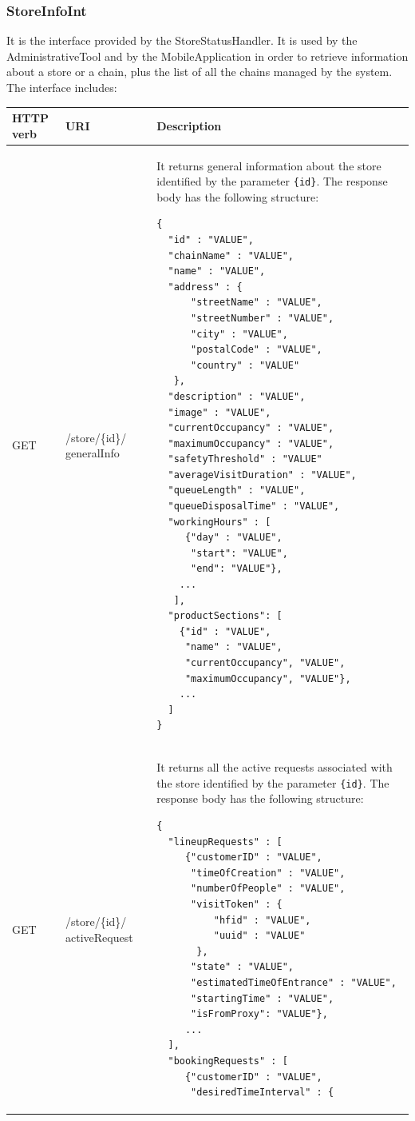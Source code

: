 \documentclass[a4paper,oneside,11pt]{book}
\begin{document}
    \subsubsection{StoreInfoInt}
    It is the interface provided by the StoreStatusHandler. It is used by the AdministrativeTool and by the MobileApplication in order to retrieve information about a store or a chain, plus the list of all the chains managed by the system. The interface includes:
    \begin{longtable}[c] { |>{\centering\arraybackslash}P{0.11\textwidth}|>{\centering\arraybackslash\ttfamily}H{0.23\textwidth}|H{0.50\textwidth}| }
        \hline
        \textbf{HTTP verb} & \textrm{\textbf{URI}} & \textbf{\textbf{Description}} \\ \hline
        GET &/store/\{id\}/ generalInfo & It returns general information about the store identified by the parameter \texttt{\{id\}}. The response body has the following structure:
        \begin{lstlisting}[language=jsonDD]
{  
  "id" : "VALUE",
  "chainName" : "VALUE",
  "name" : "VALUE",
  "address" : {
      "streetName" : "VALUE",
      "streetNumber" : "VALUE",
      "city" : "VALUE",
      "postalCode" : "VALUE",
      "country" : "VALUE"
   },
  "description" : "VALUE",
  "image" : "VALUE",
  "currentOccupancy" : "VALUE",
  "maximumOccupancy" : "VALUE",
  "safetyThreshold" : "VALUE"
  "averageVisitDuration" : "VALUE",
  "queueLength" : "VALUE",
  "queueDisposalTime" : "VALUE",
  "workingHours" : [
     {"day" : "VALUE",
      "start": "VALUE",
      "end": "VALUE"},
    ...
   ],
  "productSections": [
    {"id" : "VALUE",
     "name" : "VALUE",
     "currentOccupancy", "VALUE",
     "maximumOccupancy", "VALUE"},
    ...
  ]
}
        \end{lstlisting} \\ \hline
        GET & /store/\{id\}/ activeRequest & It returns all the active requests associated with the store identified by the parameter \texttt{\{id\}}. The response body has the following structure:
        \begin{lstlisting}[language=jsonDD]
{
  "lineupRequests" : [
     {"customerID" : "VALUE",
      "timeOfCreation" : "VALUE",
      "numberOfPeople" : "VALUE",
      "visitToken" : {
          "hfid" : "VALUE",
          "uuid" : "VALUE"
       },
      "state" : "VALUE",
      "estimatedTimeOfEntrance" : "VALUE",
      "startingTime" : "VALUE",
      "isFromProxy": "VALUE"},
     ...
  ],
  "bookingRequests" : [
     {"customerID" : "VALUE",
      "desiredTimeInterval" : {

\end{lstlisting}
\end{longtable}
\end{document}
